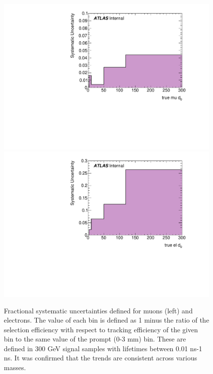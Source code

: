 \begin{figure}[htbp]
\centering
\includegraphics[width=.48\textwidth]{figures/disp_systs/signal_sf_d0_mu_300.pdf}
\includegraphics[width=.48\textwidth]{figures/disp_systs/signal_sf_d0_el_300.pdf}
\caption{Fractional systematic uncertainties defined for muons (left) and electrons. The value of each bin is defined as 1 minus the ratio of the selection efficiency with respect to tracking efficiency of the given bin to the same value of the prompt (0-3 mm) bin. These are defined in 300 GeV \slep signal samples with lifetimes between 0.01 ns-1 ns. It was confirmed that the trends are consistent across various \slep masses.}
\label{fig:disp_systs}
\end{figure}



